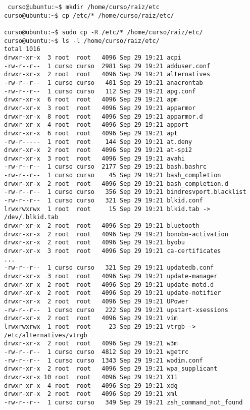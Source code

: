 \documentclass[a4paper,11pt,spanish]{article} %
\newenvironment{myscriptlisting}
{\begin{list}{}{\setlength{\leftmargin}{1em}}\item\scriptsize\bfseries}
{\end{list}}
\begin{document}
\begin{myscriptlisting}
  \begin{verbatim}
 curso@ubuntu:~$ mkdir /home/curso/raiz/etc
curso@ubuntu:~$ cp /etc/* /home/curso/raiz/etc/

curso@ubuntu:~$ sudo cp -R /etc/* /home/curso/raiz/etc/ 
curso@ubuntu:~$ ls -l /home/curso/raiz/etc/
total 1016
drwxr-xr-x  3 root  root   4096 Sep 29 19:21 acpi
-rw-r--r--  1 curso curso  2981 Sep 29 19:21 adduser.conf
drwxr-xr-x  2 root  root   4096 Sep 29 19:21 alternatives
-rw-r--r--  1 curso curso   401 Sep 29 19:21 anacrontab
-rw-r--r--  1 curso curso   112 Sep 29 19:21 apg.conf
drwxr-xr-x  6 root  root   4096 Sep 29 19:21 apm
drwxr-xr-x  3 root  root   4096 Sep 29 19:21 apparmor
drwxr-xr-x  8 root  root   4096 Sep 29 19:21 apparmor.d
drwxr-xr-x  4 root  root   4096 Sep 29 19:21 apport
drwxr-xr-x  6 root  root   4096 Sep 29 19:21 apt
-rw-r-----  1 root  root    144 Sep 29 19:21 at.deny
drwxr-xr-x  2 root  root   4096 Sep 29 19:21 at-spi2
drwxr-xr-x  3 root  root   4096 Sep 29 19:21 avahi
-rw-r--r--  1 curso curso  2177 Sep 29 19:21 bash.bashrc
-rw-r--r--  1 curso curso    45 Sep 29 19:21 bash_completion
drwxr-xr-x  2 root  root   4096 Sep 29 19:21 bash_completion.d
-rw-r--r--  1 curso curso   356 Sep 29 19:21 bindresvport.blacklist
-rw-r--r--  1 curso curso   321 Sep 29 19:21 blkid.conf
lrwxrwxrwx  1 root  root     15 Sep 29 19:21 blkid.tab -> /dev/.blkid.tab
drwxr-xr-x  2 root  root   4096 Sep 29 19:21 bluetooth
drwxr-xr-x  2 root  root   4096 Sep 29 19:21 bonobo-activation
drwxr-xr-x  2 root  root   4096 Sep 29 19:21 byobu
drwxr-xr-x  3 root  root   4096 Sep 29 19:21 ca-certificates
...
-rw-r--r--  1 curso curso   321 Sep 29 19:21 updatedb.conf
drwxr-xr-x  3 root  root   4096 Sep 29 19:21 update-manager
drwxr-xr-x  2 root  root   4096 Sep 29 19:21 update-motd.d
drwxr-xr-x  2 root  root   4096 Sep 29 19:21 update-notifier
drwxr-xr-x  2 root  root   4096 Sep 29 19:21 UPower
-rw-r--r--  1 curso curso   222 Sep 29 19:21 upstart-xsessions
drwxr-xr-x  2 root  root   4096 Sep 29 19:21 vim
lrwxrwxrwx  1 root  root     23 Sep 29 19:21 vtrgb -> /etc/alternatives/vtrgb
drwxr-xr-x  2 root  root   4096 Sep 29 19:21 w3m
-rw-r--r--  1 curso curso  4812 Sep 29 19:21 wgetrc
-rw-r--r--  1 curso curso  1343 Sep 29 19:21 wodim.conf
drwxr-xr-x  2 root  root   4096 Sep 29 19:21 wpa_supplicant
drwxr-xr-x 10 root  root   4096 Sep 29 19:21 X11
drwxr-xr-x  4 root  root   4096 Sep 29 19:21 xdg
drwxr-xr-x  2 root  root   4096 Sep 29 19:21 xml
-rw-r--r--  1 curso curso   349 Sep 29 19:21 zsh_command_not_found
  \end{verbatim}
\end{myscriptlisting}
\end{document}
